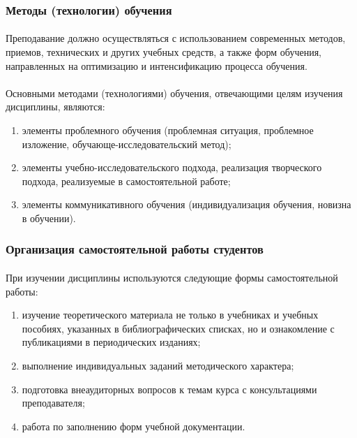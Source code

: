 \subsubsection{Методы (технологии) обучения}

\paragraph*{}Преподавание должно осуществляться с использованием современных методов, приемов, технических и других учебных средств, а также форм обучения, направленных на оптимизацию и интенсификацию процесса обучения.

\paragraph*{}Основными методами (технологиями) обучения, отвечающими целям изучения дисциплины, являются:

\begin{enumerate}

\item элементы проблемного обучения (проблемная ситуация, проблемное изложение, обучающе-исследовательский метод);
\item элементы учебно-исследовательского подхода, реализация творческого подхода, реализуемые в самостоятельной работе;
\item элементы коммуникативного обучения (индивидуализация обучения, новизна 
в обучении).

\end{enumerate}

\subsubsection{Организация самостоятельной работы студентов}

\paragraph*{}При изучении дисциплины используются следующие формы самостоятельной работы:

\begin{enumerate}

\item изучение теоретического материала не только в учебниках и учебных пособиях, указанных в библиографических списках, но и ознакомление с публикациями в периодических изданиях; 
\item выполнение индивидуальных заданий методического характера;
\item подготовка внеаудиторных вопросов к темам курса с консультациями преподавателя;
\item работа по заполнению форм учебной документации.

\end{enumerate}

